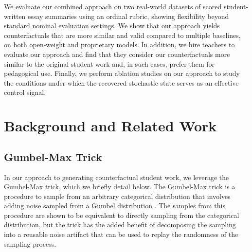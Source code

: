\documentclass[11pt]{article}
\newcommand{\ml}[1]{\textcolor{orange}{\bf [lan: #1]}}
\begin{document}
We evaluate our combined approach on two real-world datasets of scored student-written essay summaries using an ordinal rubric, showing flexibility beyond standard nominal evaluation settings. We show that our approach yields counterfactuals that are more similar and valid compared to multiple baselines, on both open-weight and proprietary models.
In addition, we hire teachers to evaluate our approach and find that they consider our counterfactuals more similar to the original student work and, in such cases, prefer them for pedagogical use. 
Finally, we perform ablation studies on our approach to study the conditions under which the recovered stochastic state serves as an effective control signal.



\section{Background and Related Work}
\subsection{Gumbel-Max Trick}\label{sec:trick}

In our approach to generating counterfactual student work, we leverage the Gumbel-Max trick, which we briefly detail below. The Gumbel-Max trick is a procedure to sample from an arbitrary categorical distribution that involves adding noise sampled from a Gumbel distribution \cite{Maddison2014AS}. The samples from this procedure are shown to be equivalent to directly sampling from the categorical distribution, but the trick has the added benefit of decomposing the sampling into a reusable noise artifact that can be used to replay the randomness of the sampling process. 
\end{document}
